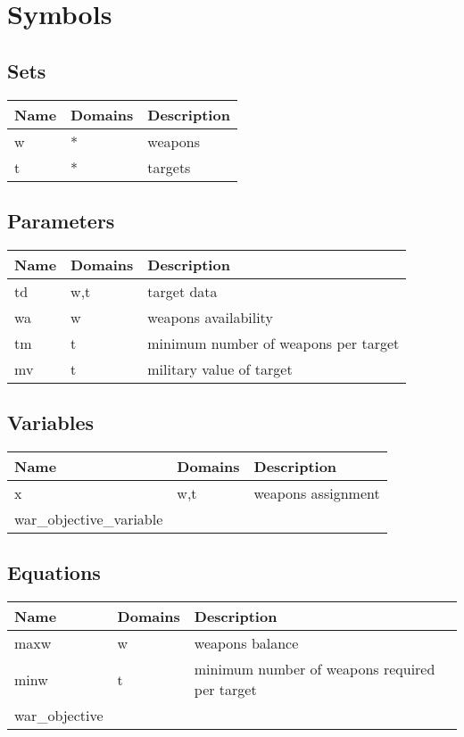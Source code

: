 \documentclass[11pt]{article}
\begin{document}
\section*{Symbols}


\subsection*{Sets}
\begin{tabularx}{\textwidth}{| l | l | X |}
\hline
\textbf{Name} & \textbf{Domains} & \textbf{Description}\\
\hline
\endhead

w & * & weapons\\
t & * & targets\\
\hline
\end{tabularx}
\subsection*{Parameters}
\begin{tabularx}{\textwidth}{| l | l | X |}
\hline
\textbf{Name} & \textbf{Domains} & \textbf{Description}\\
\hline
\endhead

td & w,t & target data\\
wa & w & weapons availability\\
tm & t & minimum number of weapons per target\\
mv & t & military value of target\\
\hline
\end{tabularx}
\subsection*{Variables}
\begin{tabularx}{\textwidth}{| l | l | X |}
\hline
\textbf{Name} & \textbf{Domains} & \textbf{Description}\\
\hline
\endhead

x & w,t & weapons assignment\\
war\_objective\_variable &  & \\
\hline
\end{tabularx}
\subsection*{Equations}
\begin{tabularx}{\textwidth}{| l | l | X |}
\hline
\textbf{Name} & \textbf{Domains} & \textbf{Description}\\
\hline
\endhead

maxw & w & weapons balance\\
minw & t & minimum number of weapons required per target\\
war\_objective &  & \\
\hline
\end{tabularx}
\end{document}
